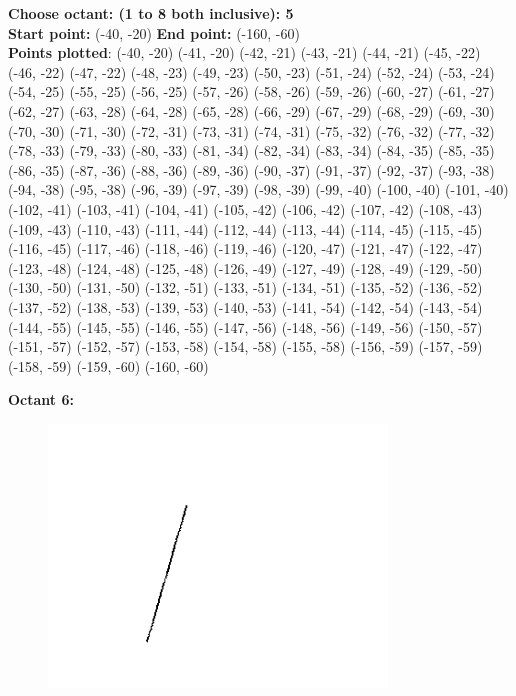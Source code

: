 \documentclass[12pt,letterpaper]{article}
\begin{document}
\textbf{Choose octant: (1 to 8 both inclusive): 5}\\
\textbf{Start point:} (-40, -20)
\textbf{End point:} (-160, -60)\\
\textbf{Points plotted}: 
(-40, -20) (-41, -20) (-42, -21) (-43, -21) 
(-44, -21) (-45, -22) (-46, -22) (-47, -22) 
(-48, -23) (-49, -23) (-50, -23) (-51, -24) 
(-52, -24) (-53, -24) (-54, -25) (-55, -25) 
(-56, -25) (-57, -26) (-58, -26) (-59, -26) 
(-60, -27) (-61, -27) (-62, -27) (-63, -28) 
(-64, -28) (-65, -28) (-66, -29) (-67, -29) 
(-68, -29) (-69, -30) (-70, -30) (-71, -30) 
(-72, -31) (-73, -31) (-74, -31) (-75, -32) 
(-76, -32) (-77, -32) (-78, -33) (-79, -33) 
(-80, -33) (-81, -34) (-82, -34) (-83, -34) 
(-84, -35) (-85, -35) (-86, -35) (-87, -36) 
(-88, -36) (-89, -36) (-90, -37) (-91, -37) 
(-92, -37) (-93, -38) (-94, -38) (-95, -38) 
(-96, -39) (-97, -39) (-98, -39) (-99, -40) 
(-100, -40) (-101, -40) (-102, -41) (-103, -41) 
(-104, -41) (-105, -42) (-106, -42) (-107, -42) 
(-108, -43) (-109, -43) (-110, -43) (-111, -44) 
(-112, -44) (-113, -44) (-114, -45) (-115, -45) 
(-116, -45) (-117, -46) (-118, -46) (-119, -46) 
(-120, -47) (-121, -47) (-122, -47) (-123, -48) 
(-124, -48) (-125, -48) (-126, -49) (-127, -49) 
(-128, -49) (-129, -50) (-130, -50) (-131, -50) 
(-132, -51) (-133, -51) (-134, -51) (-135, -52) 
(-136, -52) (-137, -52) (-138, -53) (-139, -53) 
(-140, -53) (-141, -54) (-142, -54) (-143, -54) 
(-144, -55) (-145, -55) (-146, -55) (-147, -56) 
(-148, -56) (-149, -56) (-150, -57) (-151, -57) 
(-152, -57) (-153, -58) (-154, -58) (-155, -58) 
(-156, -59) (-157, -59) (-158, -59) (-159, -60) 
(-160, -60)

\newpage
\textbf{Octant 6:}
\begin{figure}[h]
    \centering
    \includegraphics[height=7cm]{Outputs/O6-1.png}
\end{figure}
\end{document}
